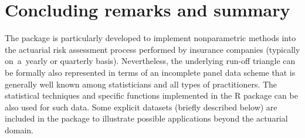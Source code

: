 \section{Concluding remarks and summary}
\label{beyondSection}
The  package is particularly developed to implement nonparametric methods into the actuarial risk assessment process performed by insurance companies (typically on~a~yearly or quarterly basis). Nevertheless, the underlying run-off triangle can be formally also represented in terms of an incomplete panel data scheme  that is generally well known among statisticians and all types of practitioners. 
The statistical techniques and specific functions implemented in the R package  can be also used for such data. Some explicit datasets (briefly described below) are included in the package to illustrate possible applications beyond the actuarial domain.


